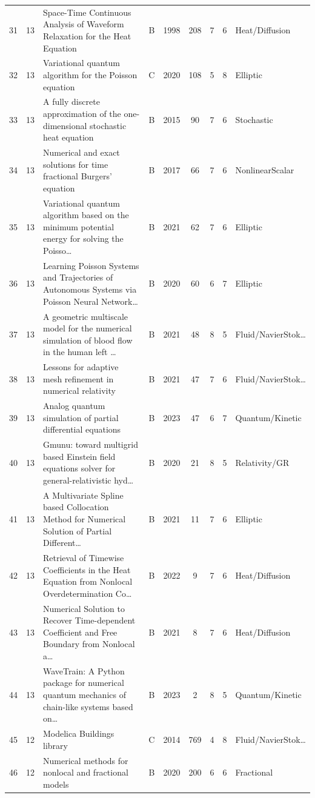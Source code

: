 \documentclass[10pt,letterpaper]{article}
\begin{document}
\begin{center}
\begin{longtable}{rrp{}cccccp{}}
31 & 13 & Space-Time Continuous Analysis of Waveform Relaxation for the Heat Equation & B & 1998 & 208 & 7 & 6 & Heat/Diffusion \\
32 & 13 & Variational quantum algorithm for the Poisson equation & C & 2020 & 108 & 5 & 8 & Elliptic \\
33 & 13 & A fully discrete approximation of the one-dimensional stochastic heat equation & B & 2015 & 90 & 7 & 6 & Stochastic \\
34 & 13 & Numerical and exact solutions for time fractional Burgers' equation & B & 2017 & 66 & 7 & 6 & NonlinearScalar \\
35 & 13 & Variational quantum algorithm based on the minimum potential energy for solving the Poisso… & B & 2021 & 62 & 7 & 6 & Elliptic \\
36 & 13 & Learning Poisson Systems and Trajectories of Autonomous Systems via Poisson Neural Network… & B & 2020 & 60 & 6 & 7 & Elliptic \\
37 & 13 & A geometric multiscale model for the numerical simulation of blood flow in the human left … & B & 2021 & 48 & 8 & 5 & Fluid/NavierStok… \\
38 & 13 & Lessons for adaptive mesh refinement in numerical relativity & B & 2021 & 47 & 7 & 6 & Fluid/NavierStok… \\
39 & 13 & Analog quantum simulation of partial differential equations & B & 2023 & 47 & 6 & 7 & Quantum/Kinetic \\
40 & 13 & Gmunu: toward multigrid based Einstein field equations solver for general-relativistic hyd… & B & 2020 & 21 & 8 & 5 & Relativity/GR \\
41 & 13 & A Multivariate Spline based Collocation Method for Numerical Solution of Partial Different… & B & 2021 & 11 & 7 & 6 & Elliptic \\
42 & 13 & Retrieval of Timewise Coefficients in the Heat Equation from Nonlocal Overdetermination Co… & B & 2022 & 9 & 7 & 6 & Heat/Diffusion \\
43 & 13 & Numerical Solution to Recover Time-dependent Coefficient and Free Boundary from Nonlocal a… & B & 2021 & 8 & 7 & 6 & Heat/Diffusion \\
44 & 13 & WaveTrain: A Python package for numerical quantum mechanics of chain-like systems based on… & B & 2023 & 2 & 8 & 5 & Quantum/Kinetic \\
45 & 12 & Modelica Buildings library & C & 2014 & 769 & 4 & 8 & Fluid/NavierStok… \\
46 & 12 & Numerical methods for nonlocal and fractional models & B & 2020 & 200 & 6 & 6 & Fractional \\

\end{longtable}
\end{center}
\end{document}
